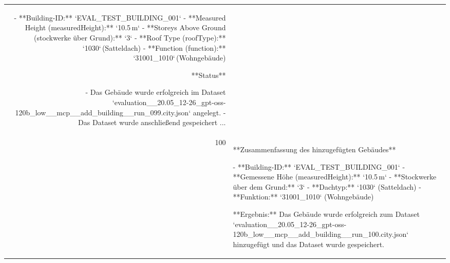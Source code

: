 \documentclass[a4paper,11pt]{article}
\begin{document}
\begin{table}[ht]
\begin{tabular}{r p{12cm}}
- **Building-ID:** `EVAL\_TEST\_BUILDING\_001`  
- **Measured Height (measuredHeight):** `10.5 m`  
- **Storeys Above Ground (stockwerke über Grund):** `3`  
- **Roof Type (roofType):** `1030` (Satteldach)  
- **Function (function):** `31001\_1010` (Wohngebäude)  

**Status**

- Das Gebäude wurde erfolgreich im Dataset `evaluation\_\_20.05\_12-26\_gpt-oss-120b\_low\_\_mcp\_\_add\_building\_\_run\_099.city.json` angelegt.  
- Das Dataset wurde anschließend gespeichert ... \\
100 & **Zusammenfassung des hinzugefügten Gebäudes**

- **Building-ID:** `EVAL\_TEST\_BUILDING\_001`  
- **Gemessene Höhe (measuredHeight):** `10.5 m`  
- **Stockwerke über dem Grund:** `3`  
- **Dachtyp:** `1030` (Satteldach)  
- **Funktion:** `31001\_1010` (Wohngebäude)  

**Ergebnis:**  
Das Gebäude wurde erfolgreich zum Dataset `evaluation\_\_20.05\_12-26\_gpt-oss-120b\_low\_\_mcp\_\_add\_building\_\_run\_100.city.json` hinzugefügt und das Dataset wurde gespeichert. \\
\hline
\end{tabular}
\end{table}

\clearpage
\end{document}
